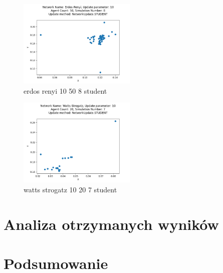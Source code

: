 \documentclass{wfiisul}
\begin{document}
\begin{figure}
  \centering
  \includegraphics[width=0.5\textwidth]{img/erdos_renyi_10_50_8_student.png}
  \caption{erdos renyi 10 50 8 student}
  \label{fig:erdos_renyi_10_50_8_student}
\end{figure}

\begin{figure}
  \centering
  \includegraphics[width=0.5\textwidth]{img/watts_strogatz_10_20_7_student.png}
  \caption{watts strogatz 10 20 7 student}
  \label{fig:watts_strogatz_10_20_7_student}
\end{figure}


\chapter{Analiza otrzymanych wyników}




\chapter{Podsumowanie}

\listoftables
\listoffigures


\end{document}
